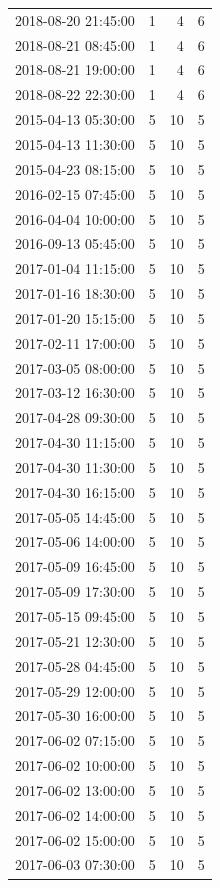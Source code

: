 \begin{tabular}{lrrr}
2018-08-20 21:45:00 & 1 & 4 & 6 \\
2018-08-21 08:45:00 & 1 & 4 & 6 \\
2018-08-21 19:00:00 & 1 & 4 & 6 \\
2018-08-22 22:30:00 & 1 & 4 & 6 \\
2015-04-13 05:30:00 & 5 & 10 & 5 \\
2015-04-13 11:30:00 & 5 & 10 & 5 \\
2015-04-23 08:15:00 & 5 & 10 & 5 \\
2016-02-15 07:45:00 & 5 & 10 & 5 \\
2016-04-04 10:00:00 & 5 & 10 & 5 \\
2016-09-13 05:45:00 & 5 & 10 & 5 \\
2017-01-04 11:15:00 & 5 & 10 & 5 \\
2017-01-16 18:30:00 & 5 & 10 & 5 \\
2017-01-20 15:15:00 & 5 & 10 & 5 \\
2017-02-11 17:00:00 & 5 & 10 & 5 \\
2017-03-05 08:00:00 & 5 & 10 & 5 \\
2017-03-12 16:30:00 & 5 & 10 & 5 \\
2017-04-28 09:30:00 & 5 & 10 & 5 \\
2017-04-30 11:15:00 & 5 & 10 & 5 \\
2017-04-30 11:30:00 & 5 & 10 & 5 \\
2017-04-30 16:15:00 & 5 & 10 & 5 \\
2017-05-05 14:45:00 & 5 & 10 & 5 \\
2017-05-06 14:00:00 & 5 & 10 & 5 \\
2017-05-09 16:45:00 & 5 & 10 & 5 \\
2017-05-09 17:30:00 & 5 & 10 & 5 \\
2017-05-15 09:45:00 & 5 & 10 & 5 \\
2017-05-21 12:30:00 & 5 & 10 & 5 \\
2017-05-28 04:45:00 & 5 & 10 & 5 \\
2017-05-29 12:00:00 & 5 & 10 & 5 \\
2017-05-30 16:00:00 & 5 & 10 & 5 \\
2017-06-02 07:15:00 & 5 & 10 & 5 \\
2017-06-02 10:00:00 & 5 & 10 & 5 \\
2017-06-02 13:00:00 & 5 & 10 & 5 \\
2017-06-02 14:00:00 & 5 & 10 & 5 \\
2017-06-02 15:00:00 & 5 & 10 & 5 \\
2017-06-03 07:30:00 & 5 & 10 & 5 \\

\end{tabular}
